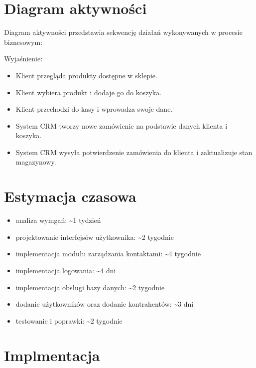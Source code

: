 \documentclass[12pt,a4paper]{article}
\begin{document}
\newpage

\section{Diagram aktywności}
Diagram aktywności przedstawia sekwencję działań wykonywanych w procesie biznesowym:

\vspace{12pt}Wyjaśnienie:
\begin{itemize}
    \item Klient przegląda produkty dostępne w sklepie.
    \item Klient wybiera produkt i dodaje go do koszyka.
    \item Klient przechodzi do kasy i wprowadza swoje dane.
    \item System CRM tworzy nowe zamówienie na podstawie danych klienta i koszyka.
    \item System CRM wysyła potwierdzenie zamówienia do klienta i zaktualizuje stan magazynowy.
\end{itemize}

\newpage

\section{Estymacja czasowa}

\begin{itemize}
    \item analiza wymgań: \textasciitilde{1 tydzień}
    \item projektowanie interfejsów użytkownika: \textasciitilde{2 tygodnie}
    \item implementacja modułu zarządzania kontaktami: \textasciitilde{4 tygodnie}
    \item implementacja logowania: \textasciitilde{4 dni}
    \item implementacja obsługi bazy danych: \textasciitilde{2 tygodnie}
    \item dodanie użytkowników oraz dodanie kontrahentów: \textasciitilde{3 dni}
    \item testowanie i poprawki: \textasciitilde{2 tygodnie}
\end{itemize}

\newpage

\section{Implmentacja}
\end{document}
